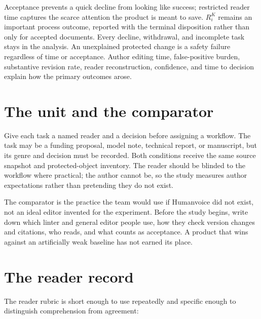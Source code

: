 Acceptance prevents a quick decline from looking like success; restricted
reader time captures the scarce attention the product is meant to save.
$R_i^K$ remains an important process outcome, reported with the terminal
disposition rather than only for accepted documents. Every decline,
withdrawal, and incomplete task stays in the analysis. An unexplained protected
change is a safety failure regardless of time or acceptance. Author editing
time, false-positive burden, substantive revision rate, reader reconstruction,
confidence, and time to decision explain how the primary outcomes arose.

\section{The unit and the comparator}

Give each task a named reader and a decision before assigning a workflow. The
task may be a funding proposal, model note, technical report, or manuscript, but
its genre and decision must be recorded. Both conditions receive the same
source snapshot and protected-object inventory. The reader should be blinded to
the workflow where practical; the author cannot be, so the study measures
author expectations rather than pretending they do not exist.

The comparator is the practice the team would use if Humanvoice did not exist,
not an ideal editor invented for the experiment. Before the study begins, write
down which linter and general editor people use, how they check version changes
and citations, who reads, and what counts as acceptance. A product that wins
against an artificially weak baseline has not earned its place.

\section{The reader record}

The reader rubric is short enough to use repeatedly and specific enough to
distinguish comprehension from agreement:

